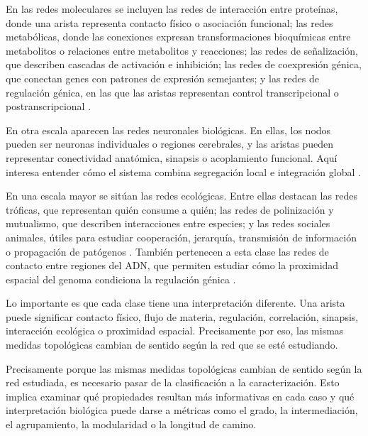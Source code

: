 \documentclass[11pt]{article}
\begin{document}
En las redes moleculares se incluyen las redes de interacción entre proteínas, donde una arista representa contacto físico o asociación funcional; las redes metabólicas, donde las conexiones expresan transformaciones bioquímicas entre metabolitos o relaciones entre metabolitos y reacciones; las redes de señalización, que describen cascadas de activación e inhibición; las redes de coexpresión génica, que conectan genes con patrones de expresión semejantes; y las redes de regulación génica, en las que las aristas representan control transcripcional o postranscripcional \parencite{EmmertStreib2014,ZhangHorvath2005,BanfRhee2017,Koutrouli2020}.

En otra escala aparecen las redes neuronales biológicas. En ellas, los nodos pueden ser neuronas individuales o regiones cerebrales, y las aristas pueden representar conectividad anatómica, sinapsis o acoplamiento funcional. Aquí interesa entender cómo el sistema combina segregación local e integración global \parencite{BullmoreSporns2009}.

En una escala mayor se sitúan las redes ecológicas. Entre ellas destacan las redes tróficas, que representan quién consume a quién; las redes de polinización y mutualismo, que describen interacciones entre especies; y las redes sociales animales, útiles para estudiar cooperación, jerarquía, transmisión de información o propagación de patógenos \parencite{Dunne2002,KrauseLusseauJames2009,Bascompte2009}. También pertenecen a esta clase las redes de contacto entre regiones del ADN, que permiten estudiar cómo la proximidad espacial del genoma condiciona la regulación génica \parencite{Beagrie2017}.

Lo importante es que cada clase tiene una interpretación diferente. Una arista puede significar contacto físico, flujo de materia, regulación, correlación, sinapsis, interacción ecológica o proximidad espacial. Precisamente por eso, las mismas medidas topológicas cambian de sentido según la red que se esté estudiando.

Precisamente porque las mismas medidas topológicas cambian de sentido según la red estudiada, es necesario pasar de la clasificación a la caracterización. Esto implica examinar qué propiedades resultan más informativas en cada caso y qué interpretación biológica puede darse a métricas como el grado, la intermediación, el agrupamiento, la modularidad o la longitud de camino. 
\end{document}
